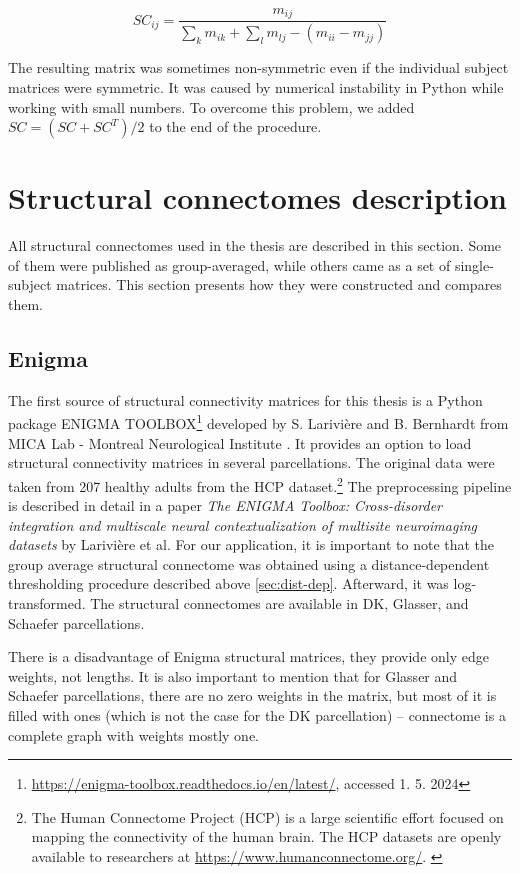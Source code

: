 $$
SC_{ij} = \frac{m_{ij}}{\sum_k m_{ik} + \sum_l m_{lj} - (m_{ii} - m_{jj})}
$$

The resulting matrix was sometimes non-symmetric even if the individual subject matrices were symmetric. It was caused by numerical instability in Python while working with small numbers. To overcome this problem, we added $SC = (SC + SC^T) /2$ to the end of the procedure.

\section{Structural connectomes description}

All structural connectomes used in the thesis are described in this section. Some of them were published as group-averaged, while others came as a set of single-subject matrices. This section presents how they were constructed and compares them. 

\subsection{Enigma}

The first source of structural connectivity matrices for this thesis is a Python package ENIGMA TOOLBOX\footnote{\url{https://enigma-toolbox.readthedocs.io/en/latest/}, accessed 1. 5. 2024} developed by S. Larivière and B. Bernhardt from MICA Lab - Montreal Neurological Institute \cite{lariviere_enigma_2020}. It provides an option to load structural connectivity matrices in several parcellations. The original data were taken from 207 healthy adults from the HCP dataset.\footnote{The Human Connectome Project (HCP) is a large scientific effort focused on mapping the connectivity of the human brain. The HCP datasets are openly available to researchers at \url{https://www.humanconnectome.org/}. \cite{van_essen_human_2012}} The preprocessing pipeline is described in detail in a paper \textit{The ENIGMA Toolbox: Cross-disorder integration and multiscale neural contextualization of multisite neuroimaging datasets} by Larivière et al. For our application, it is important to note that the group average structural connectome was obtained using a distance-dependent thresholding procedure described above \ref{sec:dist-dep}. Afterward, it was log-transformed. The structural connectomes are available in DK, Glasser, and Schaefer parcellations. 

There is a disadvantage of Enigma structural matrices, they provide only edge weights, not lengths. It is also important to mention that for Glasser and Schaefer parcellations, there are no zero weights in the matrix, but most of it is filled with ones (which is not the case for the DK parcellation) -- connectome is a complete graph with weights mostly one.

